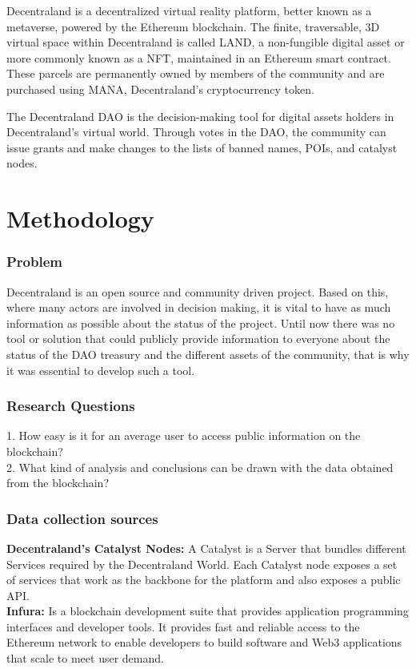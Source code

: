 \documentclass[MSE,Master,english]{twbook}%
\begin{document}
Decentraland is a decentralized virtual reality platform, better known as a metaverse, powered by the Ethereum blockchain. The finite, traversable, 3D virtual space within Decentraland is called LAND, a non-fungible digital asset or more commonly known as a NFT, maintained in an Ethereum smart contract. These parcels are permanently owned by members of the community and are purchased using MANA, Decentraland's cryptocurrency token.

The Decentraland DAO is the decision-making tool for digital assets holders in Decentraland's virtual world. Through votes in the DAO, the community can issue grants and make changes to the lists of banned names, POIs, and catalyst nodes.

\section{Methodology}
\subsubsection{Problem}
Decentraland is an open source and community driven project. Based on this, where many actors are involved in decision making, it is vital to have as much information as possible about the status of the project. Until now there was no tool or solution that could publicly provide information to everyone about the status of the DAO treasury and the different assets of the community, that is why it was essential to develop such a tool.

\subsubsection{Research Questions}
1. How easy is it for an average user to access public information on the blockchain? \\
2. What kind of analysis and conclusions can be drawn with the data obtained from the blockchain?

\subsubsection{Data collection sources}
\textbf{Decentraland's Catalyst Nodes:} A Catalyst is a Server that bundles different Services required by the Decentraland World. Each Catalyst node exposes a set of services that work as the backbone for the platform and also exposes a public API. \\

\textbf{Infura:} Is a blockchain development suite that provides application programming interfaces and developer tools. It provides fast and reliable access to the Ethereum network to enable developers to build software and Web3 applications that scale to meet user demand. \\
\end{document}
